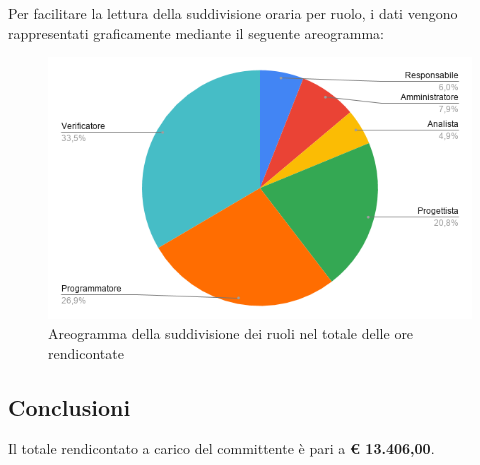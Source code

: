 \documentclass[../piano-di-progetto.tex]{subfiles}
\begin{document}
      Per facilitare la lettura della suddivisione oraria per ruolo, i dati vengono rappresentati graficamente mediante il seguente areogramma:
      \begin{figure}[H]
        \centering
        \includegraphics[width=12cm]{img/ruoli-rendicontati.png}
        \caption{Areogramma della suddivisione dei ruoli nel totale delle ore rendicontate}
        \label{fig:ore-rendicontate}
      \end{figure}
  
      \subsection{Conclusioni}
      Il totale rendicontato a carico del committente è pari a \textbf{€ 13.406,00}.
  
\end{document}
